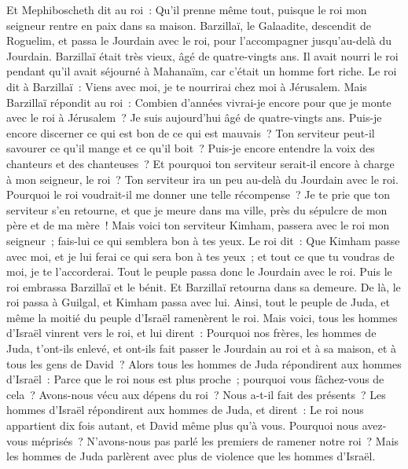 \begin{multicols}{2}
Et Mephiboscheth dit au roi~: Qu'il prenne même tout, puisque le roi mon seigneur rentre en paix dans sa maison.
Barzillaï, le Galaadite, descendit de Roguelim, et passa le Jourdain avec le roi, pour l'accompagner jusqu'au-delà du Jourdain.
Barzillaï était très vieux, âgé de quatre-vingts ans. Il avait nourri le roi pendant qu'il avait séjourné à Mahanaïm, car c'était un homme fort riche.
Le roi dit à Barzillaï~: Viens avec moi, je te nourrirai chez moi à Jérusalem.
Mais Barzillaï répondit au roi~: Combien d'années vivrai-je encore pour que je monte avec le roi à Jérusalem~?
Je suis aujourd'hui âgé de quatre-vingts ans. Puis-je encore discerner ce qui est bon de ce qui est mauvais~? Ton serviteur peut-il savourer ce qu'il mange et ce qu'il boit~? Puis-je encore entendre la voix des chanteurs et des chanteuses~? Et pourquoi ton serviteur serait-il encore à charge à mon seigneur, le roi~?
Ton serviteur ira un peu au-delà du Jourdain avec le roi. Pourquoi le roi voudrait-il me donner une telle récompense~?
Je te prie que ton serviteur s'en retourne, et que je meure dans ma ville, près du sépulcre de mon père et de ma mère~! Mais voici ton serviteur Kimham, passera avec le roi mon seigneur~; fais-lui ce qui semblera bon à tes yeux.
Le roi dit~: Que Kimham passe avec moi, et je lui ferai ce qui sera bon à tes yeux~; et tout ce que tu voudras de moi, je te l'accorderai.
Tout le peuple passa donc le Jourdain avec le roi. Puis le roi embrassa Barzillaï et le bénit. Et Barzillaï retourna dans sa demeure.
De là, le roi passa à Guilgal, et Kimham passa avec lui. Ainsi, tout le peuple de Juda, et même la moitié du peuple d'Israël ramenèrent le roi.
Mais voici, tous les hommes d'Israël vinrent vers le roi, et lui dirent~: Pourquoi nos frères, les hommes de Juda, t'ont-ils enlevé, et ont-ils fait passer le Jourdain au roi et à sa maison, et à tous les gens de David~?
Alors tous les hommes de Juda répondirent aux hommes d'Israël~: Parce que le roi nous est plus proche~; pourquoi vous fâchez-vous de cela~? Avons-nous vécu aux dépens du roi~? Nous a-t-il fait des présents~?
Les hommes d'Israël répondirent aux hommes de Juda, et dirent~: Le roi nous appartient dix fois autant, et David même plus qu'à vous. Pourquoi nous avez-vous méprisés~? N'avons-nous pas parlé les premiers de ramener notre roi~? Mais les hommes de Juda parlèrent avec plus de violence que les hommes d'Israël.

\end{multicols}
